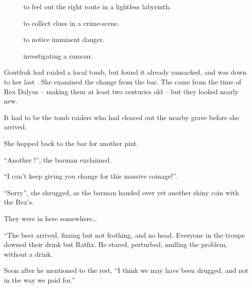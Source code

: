\begin{multicols}{2}
\begin{description}
  \item[]
    to feel out the right route in a lightless labyrinth.
  \item[]
    to collect clues in a crime-scene.
  \item[]
    to notice imminent danger.
  \item[]
    investigating a rumour.
\end{description}

\ifodd\value{r4}
\begin{exampletext}
  Goutfrak had raided a local tomb, but found it already ransacked, and was down to her last .
  She examined the change from the bar.
  The  came from the time of Rex Dalyus -- making them at least two centuries old -- but they looked nearly new.

  It had to be the tomb raiders who had cleared out the nearby grave before she arrived.

  She hopped back to the bar for another pint.

  ``Another !'',
  the barman exclaimed.

  ``I can't keep giving you change for this massive coinage!''.

  ``Sorry'',
  she shrugged, as the barman handed over yet another shiny coin with the Rex's.

  They were in here somewhere\ldots

\end{exampletext}

\else

\begin{exampletext}
  ``The beer arrived, fizzing but not frothing, and no head.
  Everyone in the troupe downed their drink but Ratfix.
  He stared, perturbed, mulling the problem, without a drink.

  Soon after he mentioned to the rest,
  ``I think we may have been drugged, and not in the way we paid for.''
\end{exampletext}
\fi

\end{multicols}

